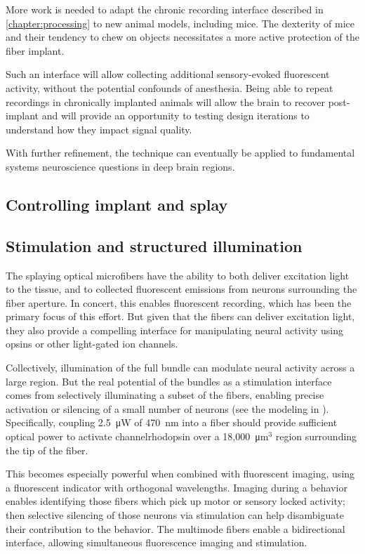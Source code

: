 More work is needed to adapt the chronic recording 
interface described in \cref{chapter:processing} to 
new animal models, including mice. The dexterity of  
mice and their tendency to chew on objects necessitates 
a more active protection of the fiber implant.

Such an interface will allow collecting additional 
sensory-evoked fluorescent activity, without the 
potential confounds of anesthesia. Being able to 
repeat recordings in chronically implanted animals 
will allow the brain to recover post-implant and will 
provide an opportunity to testing design iterations 
to understand how they impact signal quality.

With further refinement, the technique can eventually 
be applied to fundamental systems neuroscience 
questions in deep brain regions.

\subsection{Controlling implant and splay}


\subsection{Stimulation and structured illumination}

The splaying optical microfibers have the ability to 
both deliver excitation light to the tissue, and to 
collected fluorescent emissions from neurons 
surrounding the fiber aperture. In concert, this 
enables fluorescent recording, which has been the 
primary focus of this effort. But given that the 
fibers can deliver excitation light, they also 
provide a compelling interface for manipulating 
neural activity using opsins or other light-gated 
ion channels. 

Collectively, illumination of the full bundle can 
modulate neural activity across a large region. But 
the real potential of the bundles as a stimulation 
interface comes from selectively illuminating a 
subset of the fibers, enabling precise activation 
or silencing of a small number of neurons (see 
the modeling in ). 
Specifically, coupling 2.5~\si{\micro\watt} of 
470~nm into a fiber should provide sufficient 
optical power to activate channelrhodopsin over a 
18,000~\si{\micro\meter}$^3$ region surrounding 
the tip of the fiber.

This becomes especially powerful when combined 
with fluorescent imaging, using a fluorescent 
indicator with orthogonal wavelengths. Imaging 
during a behavior enables identifying those 
fibers which pick up motor or sensory locked 
activity; then selective silencing of those 
neurons via stimulation can help disambiguate 
their contribution to the behavior. The 
multimode fibers enable a bidirectional 
interface, allowing simultaneous fluorescence 
imaging and stimulation.

